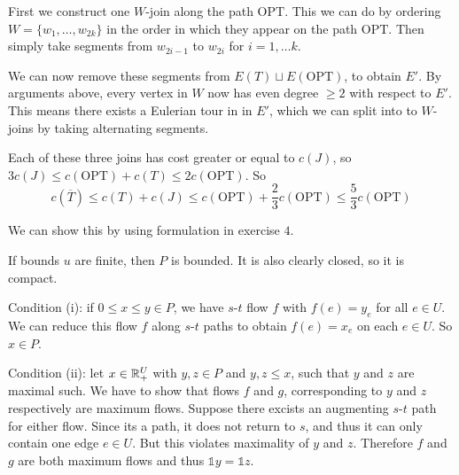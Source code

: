 \begin{exercise}{1}
    First we construct one $W$-join along the path $\text{OPT}$.
    This we can do by ordering $W = \{w_1, \dots, w_{2k}\}$ in the order in
    which they appear on the path $\text{OPT}$. Then simply take segments from
    $w_{2i - 1}$ to $w_{2i}$ for $i = 1, \dots k$.

    We can now remove these segments from $E(T) \sqcup E(\text{OPT})$, to obtain
    $E'$.
    By arguments above, every vertex in $W$ now has even degree $\geq 2$ with
    respect to $E'$. This means there exists a Eulerian tour in in $E'$, which
    we can split into to $W$-joins by taking alternating segments.

    Each of these three joins has cost greater or equal to $c(J)$, so $3c(J)
    \leq c(\text{OPT}) + c(T) \leq 2 c(\text{OPT})$.
    So
    \begin{equation*}
        c(\overline{T}) \leq c(T) + c(J) \leq c(\text{OPT}) + \frac{2}{3}
        c(\text{OPT}) \leq \frac{5}{3} c(\text{OPT})
    \end{equation*}
\end{exercise}

\begin{exercise}{2}
    We can show this by using formulation in exercise $4$.

    If bounds $u$ are finite, then $P$ is bounded. It is also clearly closed, so
    it is compact.

    Condition (i): if $0 \leq x \leq y \in P$, we have $s$-$t$ flow $f$ with
    $f(e) = y_e$ for all $e \in U$. We can reduce this flow $f$ along $s$-$t$
    paths to obtain $f(e) = x_e$ on each $e \in U$. So $x \in P$.

    Condition (ii): let $x \in \mathbb{R}^U_+$ with $y, z \in P$ and $y, z \leq x$, such
    that $y$ and $z$ are maximal such. We have to show that flows $f$ and $g$,
    corresponding to $y$ and $z$ respectively are maximum flows. Suppose there
    excists an augmenting $s$-$t$ path for either flow. Since its a path, it
    does not return to $s$, and thus it can only contain one edge $e \in U$. But
    this violates maximality of $y$ and $z$. Therefore $f$ and $g$ are both
    maximum flows and thus $\mathbb{1} y = \mathbb{1} z$.
\end{exercise}


